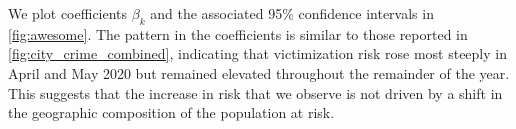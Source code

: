 We plot coefficients $\beta_k$ and the associated 95\% confidence intervals in \autoref{fig:awesome}. The pattern in the coefficients is similar to those reported in \autoref{fig:city_crime_combined}, indicating that victimization risk rose most steeply in April and May 2020 but remained elevated throughout the remainder of the year. This suggests that the increase in risk that we observe is not driven by a shift in the geographic composition of the population at risk. 





